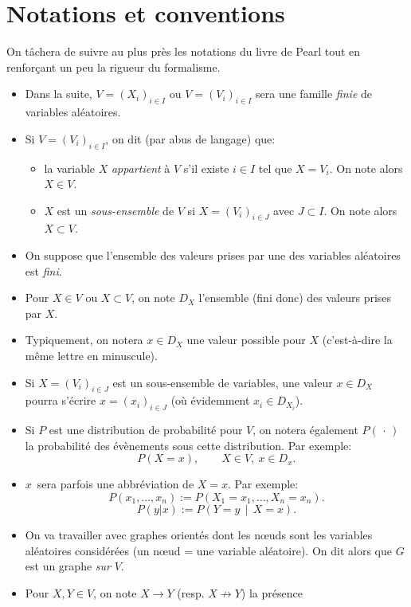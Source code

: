 \section{Notations et conventions}
\label{sec:notat-et-conv}

On tâchera de suivre au plus près les notations du livre de Pearl \cite{pearl2009causality} tout
en renforçant un peu la rigueur du formalisme.
\begin{itemize}
\item Dans la suite, \(V=(X_i)_{i\in I}\) ou \(V=(V_i)_{i\in I}\) sera une
famille \emph{finie} de variables aléatoires.
\item Si \(V=(V_i)_{i\in I}\), on dit (par abus de langage) que:
\begin{itemize}
\item la variable \(X\) \emph{appartient} à \(V\) s'il existe \(i\in I\) tel que \(X=V_i\). On note
alors \(X\in V\).
\item \(X\) est un \emph{sous-ensemble} de \(V\) si \(X=(V_i)_{i\in J}\) avec
\(J\subset I\). On note alors \(X\subset V\).
\end{itemize}
\item On suppose que l'ensemble des valeurs prises par une des
  variables aléatoires est \emph{fini}.
\item Pour \(X\in V\) ou \(X\subset V\), on note \(D_X\) l'ensemble (fini donc)
des valeurs prises par \(X\).
\item Typiquement, on notera \(x\in D_X\) une valeur possible pour \(X\)
(c'est-à-dire la même lettre en minuscule).
\item Si \(X=(V_i)_{i\in J}\) est un sous-ensemble de variables, une valeur
\(x\in D_X\) pourra s'écrire \(x=(x_i)_{i\in J}\) (où évidemment $x_i\in D_{X_i}$).
\item Si \(P\) est une distribution de probabilité pour 
\(V\), on notera également \(P(\,\cdot\,)\) la probabilité des
évènements sous cette distribution. Par exemple:
\[ P(X=x),\qquad X\in V,\ x\in D_x. \]
\item \og\(x\)\fg\  sera parfois une abbréviation de \og\(X=x\)\fg. Par exemple:
\[ P(x_1,\dots,x_n):=P(X_1=x_1,\dots,X_n=x_n). \]
\[ P(y|x):=P\left( Y=y\,\middle|\,X=x \right).  \]
\item On va travailler avec graphes orientés dont les n\oe uds sont les
variables aléatoires considérées (un n\oe ud = une variable aléatoire). On dit alors que \(G\) est un graphe
\emph{sur} \(V\).
\item Pour \(X,Y\in V\), on note \(X\to Y\) (resp. \(X\not \to Y\)) la présence

\end{itemize}
